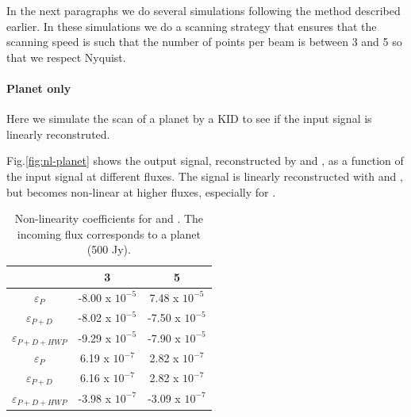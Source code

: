 In the next paragraphs we do several simulations following the method described earlier. In these simulations we do a scanning strategy that ensures that the scanning speed is such that the number of points per beam is between 3 and 5 so that we respect Nyquist.


\paragraph{Planet only \\}

Here we simulate the scan of a planet by a KID to see if the input signal is linearly reconstruted.


Fig.\ref{fig:nl-planet} shows the output signal, reconstructed by \rf and \cf, as a function of the input signal at different fluxes. The signal is linearly reconstructed with \rf and \cf, but becomes non-linear at higher fluxes, especially for \rf.  \\

 \begin{table}[h!]
\center
	\begin{tabular}{|c|c|c|}
  	\hline
 	\backslashbox{$\varepsilon$}{$npts/fwhm$} & 3 & 5 \\
	\hline
 	 $\varepsilon_{P}$ & -8.00 x $10^{-5}$ & 7.48 x $10^{-5}$ \\
  	\hline
 	$\varepsilon_{P+D}$ & -8.02 x $10^{-5}$ & -7.50 x $10^{-5}$ \\
  	\hline
  	$\varepsilon_{P+D+HWP}$ & -9.29 x $10^{-5}$ & -7.90 x $10^{-5}$ \\
	\hline
 	$\varepsilon_{P}$ & 6.19 x $10^{-7}$ & 2.82 x $10^{-7}$ \\
  	\hline
 	$\varepsilon_{P+D}$ & 6.16 x $10^{-7}$ & 2.82 x $10^{-7}$ \\
  	\hline
  	$\varepsilon_{P+D+HWP}$ & -3.98 x $10^{-7}$ & -3.09 x $10^{-7}$ \\
	\hline
	\end{tabular} 
\caption{Non-linearity coefficients \eps for \rf and \cf. The incoming flux corresponds to a planet (500 Jy).}
\label{tab:eps-planet}
\end{table} 

